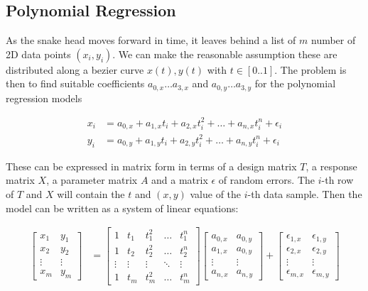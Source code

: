 \subsection{Polynomial Regression}
\label{sec:polynomial-regression}

As the snake head moves forward in time, it leaves behind a list of $m$  number
of 2D data points $(x_i,y_i)$. We can make the reasonable assumption these  are
distributed along  a bezier curve $x(t),y(t)$ with $t\in[0..1]$. The problem is
then to find suitable coefficients $a_{0,x} \ldots a_{3,x}$ and $a_{0,y} \ldots
a_{3,y}$ for the polynomial regression models

\begin{align}
    x_i &= a_{0,x} + a_{1,x} t_i + a_{2,x} t_i^2 + \ldots + a_{n,x} t_i^n + \epsilon_i \\
    y_i &= a_{0,y} + a_{1,y} t_i + a_{2,y} t_i^2 + \ldots + a_{n,y} t_i^n + \epsilon_i
    \label{eq:regression-models}
\end{align}

These  can  be  expressed  in  matrix  form in terms of a design matrix $T$,  a
response  matrix $X$, a parameter matrix $A$ and a matrix $\epsilon$ of  random
errors. The $i$-th row of $T$ and $X$ will contain the $t$ and $(x,y)$ value of
the $i$-th data  sample.  Then  the  model can be written as a system of linear
equations:

\begin{align}
    \begin{bmatrix}
        x_1 & y_1 \\ x_2 & y_2 \\ \vdots & \vdots \\ x_m & y_m
    \end{bmatrix}
    &=
    \begin{bmatrix}
        1      & t_1     & t_1^2     & \ldots & t_1^n \\
        1      & t_2     & t_2^2     & \ldots & t_2^n \\
        \vdots & \vdots  & \vdots    & \ddots & \vdots \\
        1      & t_m     & t_m^2     & \ldots & t_m^n
    \end{bmatrix}
    \begin{bmatrix}
        a_{0,x} & a_{0,y} \\
        a_{1,x} & a_{0,y} \\
        \vdots  & \vdots \\
        a_{n,x} & a_{n,y}
    \end{bmatrix}
    +
    \begin{bmatrix}
        \epsilon_{1,x} & \epsilon_{1,y} \\
        \epsilon_{2,x} & \epsilon_{2,y} \\
        \vdots         & \vdots \\
        \epsilon_{m,x} & \epsilon_{m,y}
    \end{bmatrix}
    \label{eq:regression-model}
\end{align}

